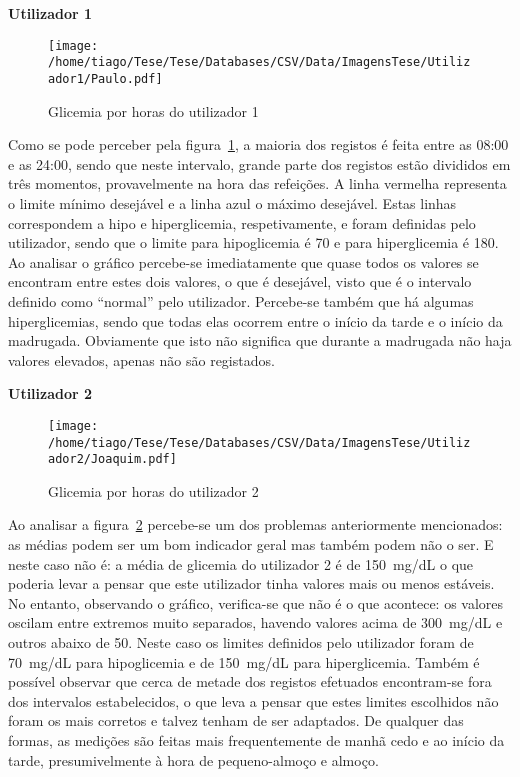 \textbf{Utilizador 1}


\begin{figure}[H]
\centering
\texttt{[image: /home/tiago/Tese/Tese/Databases/CSV/Data/ImagensTese/Utilizador1/Paulo.pdf]}
\caption{Glicemia por horas do utilizador 1}
\label{fig:uti1}
\end{figure}
Como se pode perceber pela figura~\ref{fig:uti1}, a maioria dos registos é feita entre as 08:00 e as 24:00, sendo que neste intervalo, grande parte dos registos estão divididos em três momentos, provavelmente na hora das refeições. A linha vermelha representa o limite mínimo desejável e a linha azul o máximo desejável. Estas linhas correspondem a hipo e hiperglicemia, respetivamente, e foram definidas pelo utilizador, sendo que o limite para hipoglicemia é 70 e para hiperglicemia é 180. Ao analisar o gráfico percebe-se imediatamente que quase todos os valores se encontram entre estes dois valores, o que é desejável, visto que é o intervalo definido como ``normal'' pelo utilizador. Percebe-se também que há algumas hiperglicemias, sendo que todas elas ocorrem entre o início da tarde e o início da madrugada. Obviamente que isto não significa que durante a madrugada não haja valores elevados, apenas não são registados.\newpage 


\textbf{Utilizador 2}


\begin{figure}[H]
\centering
\texttt{[image: /home/tiago/Tese/Tese/Databases/CSV/Data/ImagensTese/Utilizador2/Joaquim.pdf]}
\caption{Glicemia por horas do utilizador 2}
\label{fig:uti2}
\end{figure}
Ao analisar a figura~\ref{fig:uti2} percebe-se um dos problemas anteriormente mencionados: as médias podem ser um bom indicador geral mas também podem não o ser. E neste caso não é: a média de glicemia do utilizador 2 é de 150~mg/dL o que poderia levar a pensar que este utilizador tinha valores mais ou menos estáveis. No entanto, observando o gráfico, verifica-se que não é o que acontece: os valores oscilam entre extremos muito separados, havendo valores acima de 300~mg/dL e outros abaixo de 50. Neste caso os limites definidos pelo utilizador foram de 70~mg/dL para hipoglicemia e de 150~mg/dL para hiperglicemia. Também é possível observar que cerca de metade dos registos efetuados encontram-se fora dos intervalos estabelecidos, o que leva a pensar que estes limites escolhidos não foram os mais corretos e talvez tenham de ser adaptados. De qualquer das formas, as medições são feitas mais frequentemente de manhã cedo e ao início da tarde, presumivelmente à hora de pequeno-almoço e almoço.\newpage


